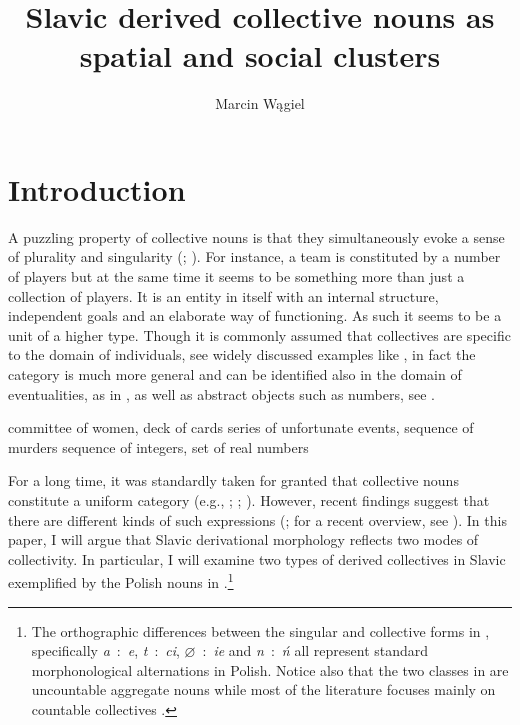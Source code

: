 \documentclass[output=paper]{langscibook}
\author{Marcin Wągiel\affiliation{Masaryk University in Brno}}
\title{Slavic derived collective nouns as spatial and social clusters}
\begin{document}
\maketitle

\section{Introduction}\label{wan:sec:introduction}

A puzzling property of collective nouns is that they simultaneously evoke a sense of plurality and singularity (\citealt[195]{jespersen1924philosophy}; \citealt{gil1996maltese}). For instance, a team is constituted by a number of players but at the same time it seems to be something more than just a collection of players. It is an entity in itself with an internal structure, independent goals and an elaborate way of functioning. As such it seems to be a unit of a higher type. Though it is commonly assumed that collectives are specific to the domain of individuals, see widely discussed examples like , in fact the category is much more general and can be identified also in the domain of eventualities, as in , as well as abstract objects such as numbers, see .

\ea \ea committee of women, deck of cards\label{wan:ex:collectives-individuals}
\ex series of unfortunate events, sequence of murders\label{wan:ex:collectives-eventualities}
\ex sequence of integers, set of real numbers\label{wan:ex:collectives-numbers}
\z
\z

\noindent For a long time, it was standardly taken for granted that collective nouns constitute a uniform category (e.g., \citealt{landman1989groupsi}; \citealt{barker1992group}; \citealt{schwarzschild1996pluralities}). However, recent findings suggest that there are different kinds of such expressions (\citealt{joosten2010collective,pearson2011new,de_vries2015shifting,henderson2017swarms,zwarts2020contiguity}; for a recent overview, see \citealt{de_vries-toappear-collective}). In this paper, I will argue that Slavic derivational morphology reflects two modes of collectivity. In particular, I will examine two types of derived collectives in Slavic exemplified by the Polish nouns in .\footnote{The orthographic differences between the singular and collective forms in , specifically \textit{a}~:~\textit{e}, \textit{t}~:~\textit{ci}, $\varnothing$~:~\textit{ie} and \textit{n}~:~\textit{ń} all represent standard morphonological alternations in Polish. Notice also that the two classes in  are uncountable aggregate nouns while most of the literature focuses mainly on countable collectives \citep[but see][]{de_vries-toappear-collective}.}
\end{document}
